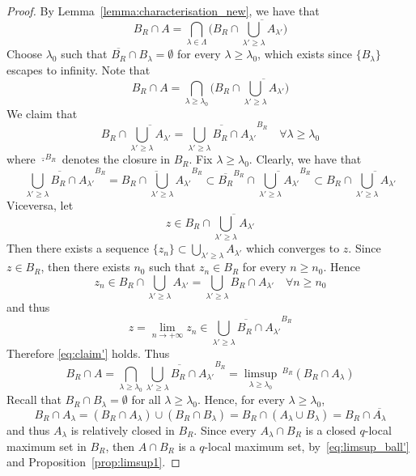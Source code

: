 \documentclass[reqno,oneside]{amsart}
\theoremstyle{definition}
\theoremstyle{plain}
\theoremstyle{remark}
\begin{document}
\begin{proof}
	By Lemma~\ref{lemma:characterisation_new}, we have that
	\[
		B_R\cap A=\bigcap_{\lambda\in\Lambda}\biggl(B_R\cap\overline{\bigcup_{\lambda'\geq\lambda} A_{\lambda'}}\biggr)
	\]
	Choose $\lambda_0$ such that $\overline{B_R}\cap B_\lambda=\emptyset$ for every $\lambda\geq\lambda_0$, which exists since $\{B_\lambda\}$ escapes to infinity. Note that
	\[
		B_R\cap A=\bigcap_{\lambda\geq\lambda_0}\biggl(B_R\cap\overline{\bigcup_{\lambda'\geq\lambda} A_{\lambda'}}\biggr)
	\]
	We claim that
	\begin{equation*}
	\label{eq:claim'} \tag{$\star$}
		B_R\cap\overline{\bigcup_{\lambda'\geq\lambda} A_{\lambda'}}=\overline{\bigcup_{\lambda'\geq\lambda} B_R\cap A_{\lambda'}}^{B_R} \quad \forall\lambda\geq\lambda_0
	\end{equation*}
	where $\overline{\cdot}^{B_R}$ denotes the closure in $B_R$. Fix $\lambda\geq\lambda_0$. Clearly, we have that
	\[
		\overline{\bigcup_{\lambda'\geq\lambda} B_R\cap A_{\lambda'}}^{B_R}=\overline{B_R\cap\bigcup_{\lambda'\geq\lambda} A_{\lambda'}}^{B_R}\subset \overline{B_R}^{B_R}\cap\overline{\bigcup_{\lambda'\geq\lambda} A_{\lambda'}}^{B_R}\subset B_R\cap\overline{\bigcup_{\lambda'\geq\lambda} A_{\lambda'}}
	\]
	Viceversa, let
	\[
		z\in B_R\cap\overline{\bigcup_{\lambda'\geq\lambda} A_{\lambda'}}
	\]
	Then there exists a sequence $\{z_n\}\subset\bigcup_{\lambda'\geq\lambda} A_{\lambda'}$ which converges to $z$. Since $z\in B_R$, then there exists $n_0$ such that $z_n\in B_R$ for every $n\geq n_0$. Hence
	\[
		z_n\in B_R\cap\bigcup_{\lambda'\geq\lambda} A_{\lambda'}=\bigcup_{\lambda'\geq\lambda} B_R\cap A_{\lambda'} \quad \forall n\geq n_0
	\]
	and thus
	\[
		z=\lim_{n\to+\infty} z_n\in\overline{\bigcup_{\lambda'\geq\lambda} B_R\cap A_{\lambda'}}^{B_R}
	\]
	Therefore \eqref{eq:claim'} holds. Thus
	\begin{equation}
	\label{eq:limsup_ball'}
		B_R\cap A=\bigcap_{\lambda\geq\lambda_0}\overline{\bigcup_{\lambda'\geq\lambda} B_R\cap A_{\lambda'}}^{B_R}=\limsup_{\lambda\geq\lambda_0}\,\!\!^{B_R} (B_R\cap A_\lambda)
	\end{equation}
	Recall that $B_R\cap B_\lambda=\emptyset$ for all $\lambda\geq\lambda_0$. Hence, for every $\lambda\geq\lambda_0$,
	\[
		B_R\cap A_\lambda=(B_R\cap A_\lambda)\cup(B_R\cap B_\lambda)=B_R\cap(A_\lambda\cup B_\lambda)=B_R\cap\overline{A_\lambda}
	\]
	and thus $A_\lambda$ is relatively closed in $B_R$. Since every $A_\lambda\cap B_R$ is a closed $q$-local maximum set in $B_R$, then $A\cap B_R$ is a $q$-local maximum set, by~\eqref{eq:limsup_ball'} and Proposition~\ref{prop:limsup1}.
\end{proof}
\end{document}
